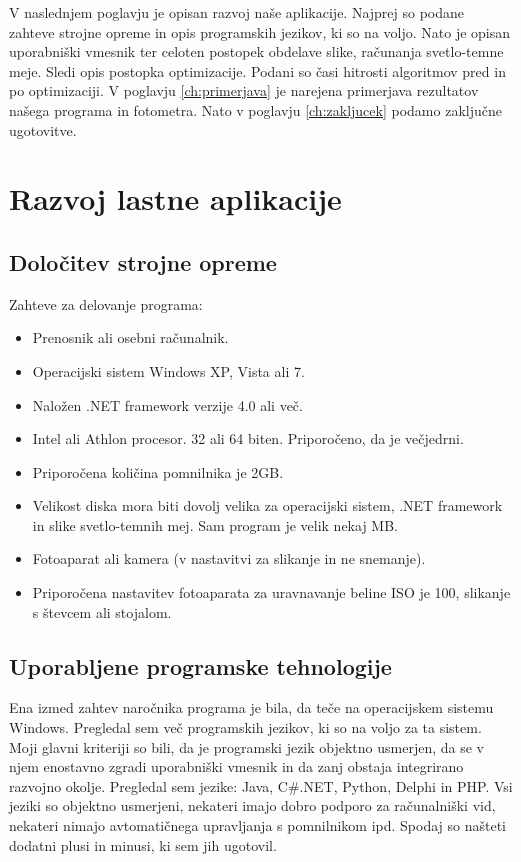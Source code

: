 \documentclass[oneside, a4paper, 12pt]{book}
\begin{document}
V naslednjem poglavju je opisan razvoj naše aplikacije. Najprej so 
podane zahteve strojne opreme in opis programskih jezikov, ki so na 
voljo. Nato je opisan uporabniški vmesnik ter celoten postopek obdelave 
slike, računanja svetlo-temne meje. Sledi opis postopka optimizacije. 
Podani so časi hitrosti algoritmov pred in po optimizaciji. V poglavju 
\ref{ch:primerjava} je narejena primerjava rezultatov našega programa 
in fotometra. Nato v poglavju \ref{ch:zakljucek} podamo zaključne 
ugotovitve.

\chapter{Razvoj lastne aplikacije}
\section{Določitev strojne opreme}
Zahteve za delovanje programa:
\begin{itemize}
\item Prenosnik ali osebni računalnik.
\item Operacijski sistem Windows XP, Vista ali 7.
\item Naložen .NET framework verzije 4.0 ali več.
\item Intel ali Athlon procesor. 32 ali 64 biten. Priporočeno, da je 
večjedrni.
\item Priporočena količina pomnilnika je 2GB.
\item Velikost diska mora biti dovolj velika za operacijski sistem, 
.NET framework in slike svetlo-temnih mej. Sam program je velik nekaj MB. 
\item Fotoaparat ali kamera (v nastavitvi za slikanje in ne snemanje).
\item Priporočena nastavitev fotoaparata za uravnavanje beline ISO je 
100, slikanje s števcem ali stojalom.
\end{itemize}

\section{Uporabljene programske tehnologije}
Ena izmed zahtev naročnika programa je bila, da teče na operacijskem 
sistemu Windows. Pregledal sem več programskih jezikov, ki so na voljo 
za ta sistem. Moji glavni kriteriji so bili, da je programski jezik 
objektno usmerjen, da se v njem enostavno zgradi uporabniški vmesnik 
in da zanj obstaja integrirano razvojno okolje. Pregledal sem jezike: 
Java, C\#.NET, Python, Delphi in PHP. Vsi jeziki so objektno usmerjeni, 
nekateri imajo dobro podporo za računalniški vid, nekateri nimajo 
avtomatičnega upravljanja s pomnilnikom ipd. Spodaj so našteti dodatni 
plusi in minusi, ki sem jih ugotovil.
\end{document}
